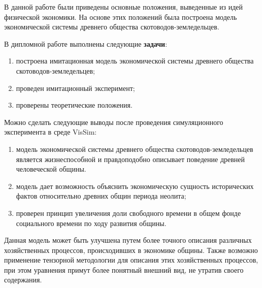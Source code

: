 
В данной работе были приведены основные положения, выведенные из идей физической экономики. На основе этих положений была построена модель экономической системы древнего общества скотоводов-земледельцев.

В дипломной работе выполнены следующие \textbf{задачи}:
\begin{enumerate}
	\item построена имитационная модель экономической системы древнего общества скотоводов-земледельцев;
	\item проведен имитационный эксперимент;
	\item проверены теоретические положения.
\end{enumerate}

Можно сделать следующие выводы после проведения симуляционного эксперимента в среде VisSim:

\begin{enumerate}
	\item модель экономической системы древнего общества скотоводов-зем\-ле\-дель\-цев является жизнеспособной и правдоподобно описывает поведение древней человеческой общины.
	\item модель дает возможность объяснить экономическую сущность исторических фактов относительно древних общин периода неолита;
	\item проверен принцип увеличения доли свободного времени в общем фонде социального времени по ходу развития общины.
\end{enumerate}

Данная модель может быть улучшена путем более точного описания различных хозяйственных процессов, происходивших в экономике общины. Также возможно применение тензорной методологии для описания этих хозяйственных процессов, при этом уравнения примут более понятный внешний вид, не утратив своего содержания.